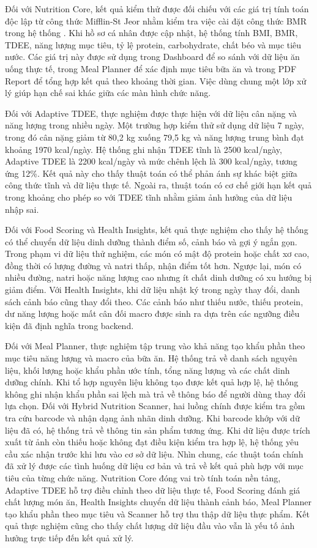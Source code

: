 \documentclass[12pt, a4paper]{report}
\begin{document}
Đối với Nutrition Core, kết quả kiểm thử được đối chiếu với các giá trị tính toán độc lập từ công thức Mifflin-St Jeor nhằm kiểm tra việc cài đặt công thức BMR trong hệ thống \cite{mifflin1990}. Khi hồ sơ cá nhân được cập nhật, hệ thống tính BMI, BMR, TDEE, năng lượng mục tiêu, tỷ lệ protein, carbohydrate, chất béo và mục tiêu nước. Các giá trị này được sử dụng trong Dashboard để so sánh với dữ liệu ăn uống thực tế, trong Meal Planner để xác định mục tiêu bữa ăn và trong PDF Report để tổng hợp kết quả theo khoảng thời gian. Việc dùng chung một lớp xử lý giúp hạn chế sai khác giữa các màn hình chức năng.

Đối với Adaptive TDEE, thực nghiệm được thực hiện với dữ liệu cân nặng và năng lượng trong nhiều ngày. Một trường hợp kiểm thử sử dụng dữ liệu 7 ngày, trong đó cân nặng giảm từ 80,2 kg xuống 79,5 kg và năng lượng trung bình đạt khoảng 1970 kcal/ngày. Hệ thống ghi nhận TDEE tĩnh là 2500 kcal/ngày, Adaptive TDEE là 2200 kcal/ngày và mức chênh lệch là 300 kcal/ngày, tương ứng 12\%. Kết quả này cho thấy thuật toán có thể phản ánh sự khác biệt giữa công thức tĩnh và dữ liệu thực tế. Ngoài ra, thuật toán có cơ chế giới hạn kết quả trong khoảng cho phép so với TDEE tĩnh nhằm giảm ảnh hưởng của dữ liệu nhập sai.

Đối với Food Scoring và Health Insights, kết quả thực nghiệm cho thấy hệ thống có thể chuyển dữ liệu dinh dưỡng thành điểm số, cảnh báo và gợi ý ngắn gọn. Trong phạm vi dữ liệu thử nghiệm, các món có mật độ protein hoặc chất xơ cao, đồng thời có lượng đường và natri thấp, nhận điểm tốt hơn. Ngược lại, món có nhiều đường, natri hoặc năng lượng cao nhưng ít chất dinh dưỡng có xu hướng bị giảm điểm. Với Health Insights, khi dữ liệu nhật ký trong ngày thay đổi, danh sách cảnh báo cũng thay đổi theo. Các cảnh báo như thiếu nước, thiếu protein, dư năng lượng hoặc mất cân đối macro được sinh ra dựa trên các ngưỡng điều kiện đã định nghĩa trong backend.

Đối với Meal Planner, thực nghiệm tập trung vào khả năng tạo khẩu phần theo mục tiêu năng lượng và macro của bữa ăn. Hệ thống trả về danh sách nguyên liệu, khối lượng hoặc khẩu phần ước tính, tổng năng lượng và các chất dinh dưỡng chính. Khi tổ hợp nguyên liệu không tạo được kết quả hợp lệ, hệ thống không ghi nhận khẩu phần sai lệch mà trả về thông báo để người dùng thay đổi lựa chọn. Đối với Hybrid Nutrition Scanner, hai luồng chính được kiểm tra gồm tra cứu barcode và nhận dạng ảnh nhãn dinh dưỡng. Khi barcode khớp với dữ liệu đã có, hệ thống trả về thông tin sản phẩm tương ứng. Khi dữ liệu được trích xuất từ ảnh còn thiếu hoặc không đạt điều kiện kiểm tra hợp lệ, hệ thống yêu cầu xác nhận trước khi lưu vào cơ sở dữ liệu.
Nhìn chung, các thuật toán chính đã xử lý được các tình huống dữ liệu cơ bản và trả về kết quả phù hợp với mục tiêu của từng chức năng. Nutrition Core đóng vai trò tính toán nền tảng, Adaptive TDEE hỗ trợ điều chỉnh theo dữ liệu thực tế, Food Scoring đánh giá chất lượng món ăn, Health Insights chuyển dữ liệu thành cảnh báo, Meal Planner tạo khẩu phần theo mục tiêu và Scanner hỗ trợ thu thập dữ liệu thực phẩm. Kết quả thực nghiệm cũng cho thấy chất lượng dữ liệu đầu vào vẫn là yếu tố ảnh hưởng trực tiếp đến kết quả xử lý.
\end{document}
